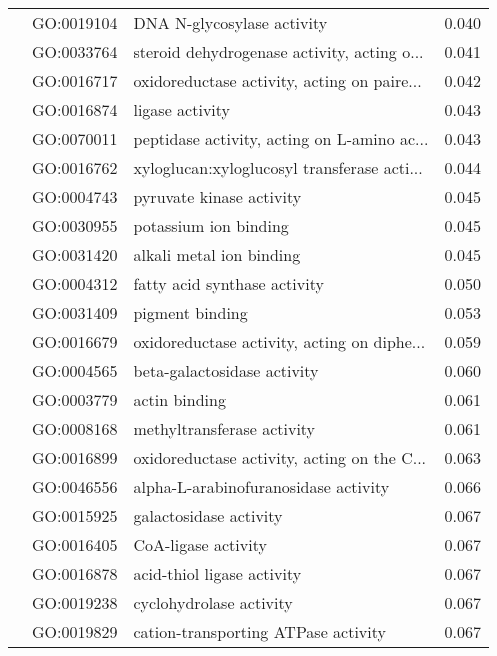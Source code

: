 \begin{longtable}{lllr}
   & GO:0019104 &                   DNA N-glycosylase activity &         0.040 \\
   & GO:0033764 &  steroid dehydrogenase activity, acting o... &         0.041 \\
   & GO:0016717 &  oxidoreductase activity, acting on paire... &         0.042 \\
   & GO:0016874 &                              ligase activity &         0.043 \\
   & GO:0070011 &  peptidase activity, acting on L-amino ac... &         0.043 \\
   & GO:0016762 &  xyloglucan:xyloglucosyl transferase acti... &         0.044 \\
   & GO:0004743 &                     pyruvate kinase activity &         0.045 \\
   & GO:0030955 &                        potassium ion binding &         0.045 \\
   & GO:0031420 &                     alkali metal ion binding &         0.045 \\
   & GO:0004312 &                 fatty acid synthase activity &         0.050 \\
   & GO:0031409 &                              pigment binding &         0.053 \\
   & GO:0016679 &  oxidoreductase activity, acting on diphe... &         0.059 \\
   & GO:0004565 &                  beta-galactosidase activity &         0.060 \\
   & GO:0003779 &                                actin binding &         0.061 \\
   & GO:0008168 &                   methyltransferase activity &         0.061 \\
   & GO:0016899 &  oxidoreductase activity, acting on the C... &         0.063 \\
   & GO:0046556 &         alpha-L-arabinofuranosidase activity &         0.066 \\
   & GO:0015925 &                       galactosidase activity &         0.067 \\
   & GO:0016405 &                          CoA-ligase activity &         0.067 \\
   & GO:0016878 &                   acid-thiol ligase activity &         0.067 \\
   & GO:0019238 &                      cyclohydrolase activity &         0.067 \\
   & GO:0019829 &          cation-transporting ATPase activity &         0.067 \\

\end{longtable}
